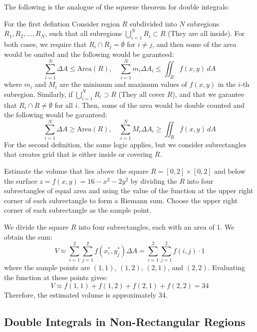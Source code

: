 \documentclass[11pt]{report}
\begin{document}
\begin{shaded}
The following is the analogue of the squeeze theorem for double integrals:
\begin{definition}
    For the first defintion Consider region $R$ subdivided into $N$ subregions $R_1, R_2, \ldots, R_N$, such that all subregions $\bigcup_{i=1}^N R_i \subset R$ (They are all inside). For both cases, we require that $R_i \cap R_j = \emptyset$ for $i \neq j$, and then some of the area would be omited and the following would be garanteed:
    $$
        \sum_{i=1}^N \Delta A \le \text{Area}(R), \quad \sum_{i=1}^N m_i \Delta A_i \le \iint_R f(x,y) \, dA 
    $$ 
    where $m_i$ and $M_i$ are the minimum and maximum values of $f(x,y)$ in the $i$-th subregion. Similarly, if $\bigcup_{i=1}^N R_i \supset R$ (They all cover $R$), and that we garantee that $R_i \cap R \neq \emptyset$ for all $i$. Then, some of the area would be double counted and the following would be garanteed:
    $$
        \sum_{i=1}^N \Delta A \ge \text{Area}(R), \quad \sum_{i=1}^N M_i \Delta A_i \ge \iint_R f(x,y) \, dA
    $$ 
    For the second definition, the same logic applies, but we consider subrectangles that creates grid that is either inside or covering $R$.
\end{definition}

\end{shaded}
\begin{example}
    Estimate the volume that lies above the square $R = [0,2] \times [0,2]$ and below the surface $z = f(x,y) = 16 - x^2 - 2y^2$ by dividing the $R$ into four subrectangles of equal area and using the value of the function at the upper right corner of each subrectangle to form a Riemann sum. Choose the upper right corner of each subrectangle as the sample point.

    We divide the square $R$ into four subrectangles, each with an area of 1. We obtain the sum:
    $$
        V \approx \sum_{i=1}^2 \sum_{j=1}^2 f(x_i^*,y_j^*) \Delta A = \sum_{i=1}^2 \sum_{j=1}^2 f(i,j) \cdot 1
    $$
    where the sample points are $(1,1)$, $(1,2)$, $(2,1)$, and $(2,2)$. Evaluating the function at these points gives:
    $$
        V \approx f(1,1) + f(1,2) + f(2,1) + f(2,2) = 34
    $$
    Therefore, the estimated volume is approximately 34.
\end{example}


\subsection{Double Integrals in Non-Rectangular Regions}
\end{document}
